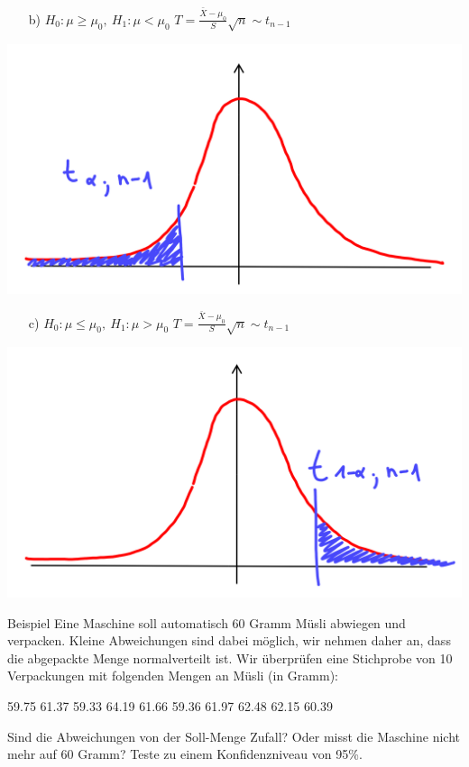 \documentclass[t,11pt,aspectratio=169]{beamer}
\begin{document}
\begin{frame}
\begin{itemize}
\item[b)] $H_0:\mu\geq\mu_0,~H_1:\mu< \mu_0$ \hfill $T=\frac{\bar{X}-\mu_0}{S}\sqrt{n}\sim t_{n-1}$ \hfill
\end{itemize}
\begin{center}
\includegraphics[scale=0.4]{6.png}
\end{center}
\end{frame}

\begin{frame}
\begin{itemize}
\item[c)] $H_0:\mu\leq\mu_0,~H_1:\mu > \mu_0$ \hfill $T=\frac{\bar{X}-\mu_0}{S}\sqrt{n}\sim t_{n-1}$ \hfill
\end{itemize}
\begin{center}
\includegraphics[scale=0.4]{7.png}
\end{center}
\end{frame}

\begin{frame}
\begin{block}{Beispiel}
	Eine Maschine soll automatisch 60 Gramm Müsli abwiegen und verpacken. Kleine Abweichungen sind dabei möglich, wir nehmen daher an, dass die abgepackte Menge normalverteilt ist. Wir überprüfen eine Stichprobe von 10 Verpackungen mit folgenden Mengen an Müsli (in Gramm):
	\begin{center}
		59.75 61.37 59.33 64.19 61.66 59.36 61.97 62.48 62.15 60.39
	\end{center}   
	Sind die Abweichungen von der Soll-Menge Zufall? Oder misst die Maschine nicht mehr auf 60 Gramm? Teste zu einem Konfidenzniveau von 95\%.
\end{block}
\end{frame}
\end{document}

